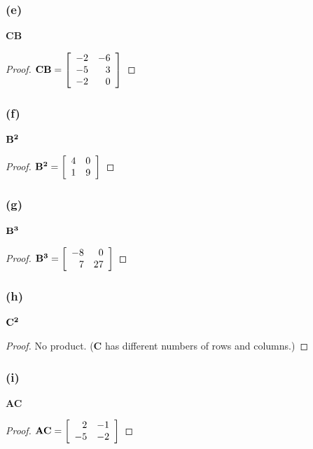 \documentclass[14pt]{extarticle}
\begin{document}
\subsubsection{(e)}
{\bf CB}
\begin{proof}
\({\bf CB} = 
\left[ 
\begin{array}{rr}
-2 & -6 \\
-5 & 3 \\
-2 & 0 \\
\end{array}
\right]
\)
\end{proof}

\subsubsection{(f)}
\({\bf B^2}\)
\begin{proof}
\({\bf B^2} = 
\left[ 
\begin{array}{rr}
4 & 0 \\
1 & 9 \\
\end{array}
\right]
\)
\end{proof}

\subsubsection{(g)}
\({\bf B^3}\)
\begin{proof}
\({\bf B^3} = 
\left[ 
\begin{array}{rr}
-8 & 0 \\
7 & 27 \\
\end{array}
\right]
\)
\end{proof}

\subsubsection{(h)}
\({\bf C^2}\)
\begin{proof}
No product. ({\bf C} has different numbers of rows and columns.)
\end{proof}

\subsubsection{(i)}
{\bf AC}
\begin{proof}
\({\bf AC} = 
\left[ 
\begin{array}{rr}
2 & -1 \\
-5 & -2 \\
\end{array}
\right]
\)
\end{proof}
\end{document}
